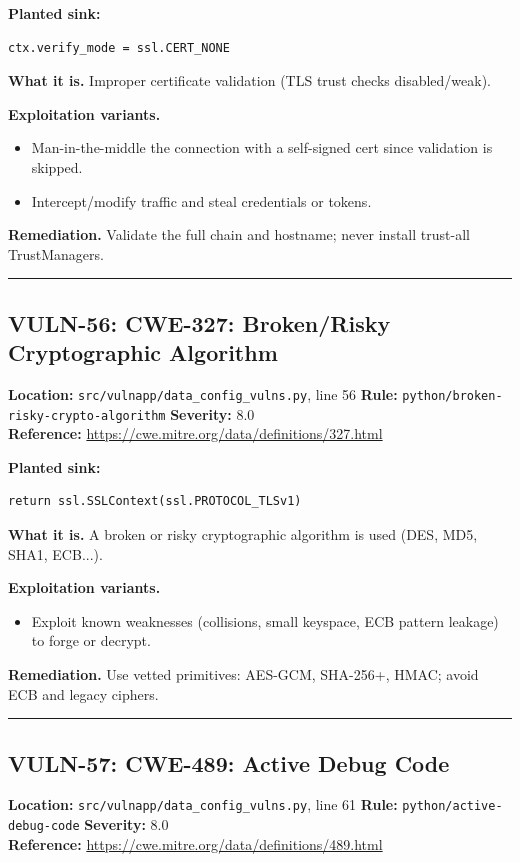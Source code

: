 \documentclass[11pt,a4paper]{article}
\begin{document}
\noindent\textbf{Planted sink:}
\begin{lstlisting}
ctx.verify_mode = ssl.CERT_NONE
\end{lstlisting}
\noindent\textbf{What it is.} Improper certificate validation (TLS trust checks disabled/weak).

\noindent\textbf{Exploitation variants.}
\begin{itemize}[leftmargin=1.4em,itemsep=1pt,topsep=2pt]
\item Man-in-the-middle the connection with a self-signed cert since validation is skipped.
\item Intercept/modify traffic and steal credentials or tokens.
\end{itemize}
\noindent\textbf{Remediation.} Validate the full chain and hostname; never install trust-all TrustManagers.

\vspace{4pt}\hrule\vspace{6pt}
\subsection{VULN-56: CWE-327: Broken/Risky Cryptographic Algorithm}
\noindent\textbf{Location:} \texttt{src/vulnapp/data\_config\_vulns.py}, line 56 \quad \textbf{Rule:} \texttt{python/broken-risky-crypto-algorithm} \quad \textbf{Severity:} 8.0
\\ \textbf{Reference:} \url{https://cwe.mitre.org/data/definitions/327.html}

\noindent\textbf{Planted sink:}
\begin{lstlisting}
return ssl.SSLContext(ssl.PROTOCOL_TLSv1)
\end{lstlisting}
\noindent\textbf{What it is.} A broken or risky cryptographic algorithm is used (DES, MD5, SHA1, ECB...).

\noindent\textbf{Exploitation variants.}
\begin{itemize}[leftmargin=1.4em,itemsep=1pt,topsep=2pt]
\item Exploit known weaknesses (collisions, small keyspace, ECB pattern leakage) to forge or decrypt.
\end{itemize}
\noindent\textbf{Remediation.} Use vetted primitives: AES-GCM, SHA-256+, HMAC; avoid ECB and legacy ciphers.

\vspace{4pt}\hrule\vspace{6pt}
\subsection{VULN-57: CWE-489: Active Debug Code}
\noindent\textbf{Location:} \texttt{src/vulnapp/data\_config\_vulns.py}, line 61 \quad \textbf{Rule:} \texttt{python/active-debug-code} \quad \textbf{Severity:} 8.0
\\ \textbf{Reference:} \url{https://cwe.mitre.org/data/definitions/489.html}
\end{document}
